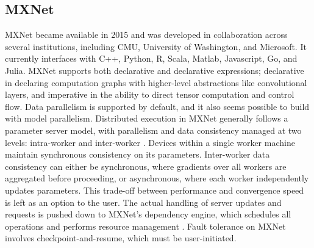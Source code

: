 \subsection{MXNet}
MXNet became available in 2015 and was developed in collaboration across several institutions, including CMU, University of Washington, and Microsoft. It currently interfaces with C++, Python, R, Scala, Matlab, Javascript, Go, and Julia. MXNet supports both declarative and declarative expressions; declarative in declaring computation graphs with higher-level abstractions like convolutional layers, and imperative in the ability to direct tensor computation and control flow. Data parallelism is supported by default, and it also seems possible to build with model parallelism. Distributed execution in MXNet generally follows a parameter server model, with parallelism and data consistency managed at two levels: intra-worker and inter-worker \cite{chen2015mxnet}. Devices within a single worker machine maintain synchronous consistency on its parameters. Inter-worker data consistency can either be synchronous, where gradients over all workers are aggregated before proceeding, or asynchronous, where each worker independently updates parameters. This trade-off between performance and convergence speed is left as an option to the user. The actual handling of server updates and requests is pushed down to MXNet's dependency engine, which schedules all operations and performs resource management \cite{chen2015mxnet}. Fault tolerance on MXNet involves checkpoint-and-resume, which must be user-initiated.

